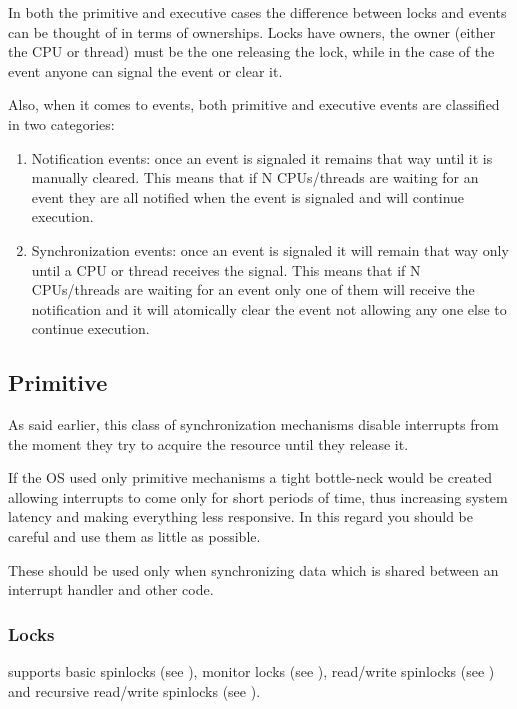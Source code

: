 \begin{appendices}
In both the primitive and executive cases the difference between locks and events can be thought of
in terms of ownerships. Locks have owners, the owner (either the CPU or thread) must be the one
releasing the lock, while in the case of the event anyone can signal the event or clear it.

Also, when it comes to events, both primitive and executive events are classified in two categories:
\begin{enumerate}
	\item Notification events: once an event is signaled it remains that way until it is manually
cleared. This means that if N CPUs/threads are waiting for an event they are all notified when the
event is signaled and will continue execution.

	\item Synchronization events: once an event is signaled it will remain that way only until a
CPU or thread receives the signal. This means that if N CPUs/threads are waiting for an event only
one of them will receive the notification and it will atomically clear the event not allowing any
one else to continue execution.
\end{enumerate}

\subsection{Primitive}
\label{sect:PrimSynch}

As said earlier, this class of synchronization mechanisms disable interrupts from the moment they
try to acquire the resource until they release it.

If the OS used only primitive mechanisms a tight bottle-neck would be created allowing interrupts to
come only for short periods of time, thus increasing system latency and making everything less
responsive. In this regard you should be careful and use them as little as possible.

These should be used only when synchronizing data which is shared between an interrupt handler and
other code.

\subsubsection{Locks}

\projectname supports basic spinlocks (see ), monitor locks (see ),
read/write spinlocks (see ) and recursive read/write spinlocks
(see ).


\end{appendices}
